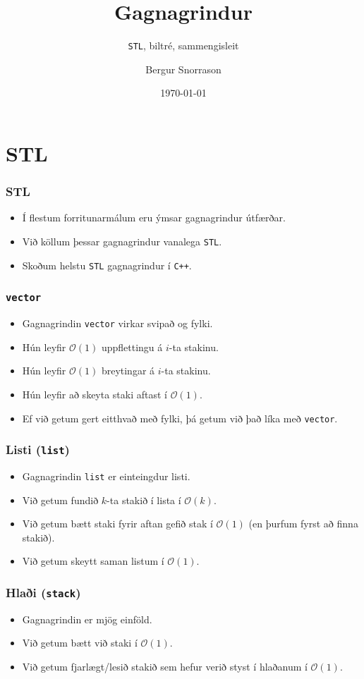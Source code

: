 \documentclass{beamer}
\title{Gagnagrindur}
\subtitle{\texttt{STL}, biltré, sammengisleit}
\author{Bergur Snorrason}
\date{\today}
\begin{document}
\frame{\titlepage}

\section[STL]{STL}

\begin{frame}
\frametitle{STL}
\begin{itemize}
	\item<1-> Í flestum forritunarmálum eru ýmsar gagnagrindur útfærðar.
	\item<2-> Við köllum þessar gagnagrindur vanalega \texttt{STL}.
	\item<3-> Skoðum helstu \texttt{STL} gagnagrindur í \texttt{C++}.
\end{itemize}
\end{frame}

\begin{frame}
\frametitle{\texttt{vector}}
\begin{itemize}
	\item Gagnagrindin \texttt{vector} virkar svipað og fylki.
	\item Hún leyfir $\mathcal{O}(1)$ uppflettingu á $i$-ta stakinu.
	\item Hún leyfir $\mathcal{O}(1)$ breytingar á $i$-ta stakinu.
	\item Hún leyfir að skeyta staki aftast í $\mathcal{O}(1)$.
	\item Ef við getum gert eitthvað með fylki, þá getum við það líka með \texttt{vector}.
\end{itemize}
\end{frame}

\begin{frame}
\frametitle{Listi (\texttt{list})}
\begin{itemize}
	\item Gagnagrindin \texttt{list} er einteingdur listi.
	\item Við getum fundið $k$-ta stakið í lista í $\mathcal{O}(k)$.
	\item Við getum bætt staki fyrir aftan gefið stak í $\mathcal{O}(1)$ (en þurfum fyrst að finna stakið).
	\item Við getum skeytt saman listum í $\mathcal{O}(1)$.
\end{itemize}
\end{frame}

\begin{frame}
\frametitle{Hlaði (\texttt{stack})}
\begin{itemize}
	\item Gagnagrindin er mjög einföld.
	\item Við getum bætt við staki í $\mathcal{O}(1)$.
	\item Við getum fjarlægt/lesið stakið sem hefur verið styst í hlaðanum í $\mathcal{O}(1)$.
\end{itemize}
\end{frame}
\end{document}
